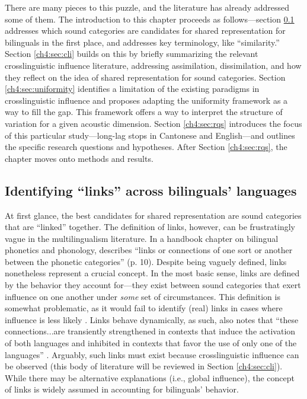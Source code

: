 There are many pieces to this puzzle, and the literature has already addressed some of them. The introduction to this chapter proceeds as follows---section \ref{ch4:sec:links} addresses which sound categories are candidates for shared representation for bilinguals in the first place, and addresses key terminology, like ``similarity.'' Section \ref{ch4:sec:cli} builds on this by briefly summarizing the relevant crosslinguistic influence literature, addressing assimilation, dissimilation, and how they reflect on the idea of shared representation for sound categories. Section \ref{ch4:sec:uniformity} identifies a limitation of the existing paradigms in crosslinguistic influence and proposes adapting the uniformity framework as a way to fill the gap. This framework offers a way to interpret the structure of variation for a given acoustic dimension. Section \ref{ch4:sec:rqs} introduces the focus of this particular study---long-lag stops in Cantonese and English---and outlines the specific research questions and hypotheses. After Section \ref{ch4:sec:rqs}, the chapter moves onto methods and results.

\subsection{Identifying ``links'' across bilinguals' languages}\label{ch4:sec:links}

At first glance, the best candidates for shared representation are sound categories that are ``linked'' together. The definition of links, however, can be frustratingly vague in the multilingualism literature. In a handbook chapter on bilingual phonetics and phonology, \citet{simonet_2016_bilingualism} describes ``links or connections of one sort or another between the phonetic categories'' (p. 10). Despite being vaguely defined, links nonetheless represent a crucial concept. In the most basic sense, links are defined by the behavior they account for---they exist between sound categories that exert influence on one another under \textit{some} set of circumstances. This definition is somewhat problematic, as it would fail to identify (real) links in cases where influence is less likely \citep[cf.][]{grosjean_2011_transfer}. Links behave dynamically, as such,  \citeauthor{simonet_2016_bilingualism} also notes that ``these connections...are transiently strengthened in contexts that induce the activation of both languages and inhibited in contexts that favor the use of only one of the languages'' \citeyearpar[][p. 10]{simonet_2016_bilingualism}. Arguably, such links must exist because crosslinguistic influence can be observed (this body of literature will be reviewed in Section \ref{ch4:sec:cli}). While there may be alternative explanations (i.e., global influence), the concept of links is widely assumed in accounting for bilinguals' behavior. 

